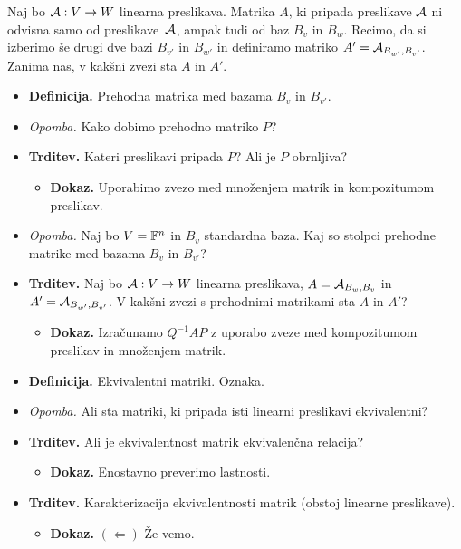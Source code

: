 \begin{enumerate}
    Naj bo $\mathcal{A}: V \to W$ linearna preslikava. Matrika $A$, ki pripada preslikave $\mathcal{A}$ ni odvisna samo od preslikave~$\mathcal{A}$, ampak tudi od baz $B_v$ in $B_w$. Recimo, da si izberimo še drugi dve bazi $B_{v'}$ in $B_{w'}$ in definiramo matriko $A' = \mathcal{A}_{B_{w'}, B_{v'}}$. Zanima nas, v kakšni zvezi sta $A$ in $A'$.
    \begin{itemize}
        \item \colorbox{purple!30}{\textbf{Definicija.}} Prehodna matrika med bazama $B_v$ in $B_{v'}$.
        \item \colorbox{yellow!30}{\emph{Opomba.}} Kako dobimo prehodno matriko $P$?
        \item \colorbox{blue!30}{\textbf{Trditev.}} Kateri preslikavi pripada $P$? Ali je $P$ obrnljiva? 
        \begin{itemize}
            \item \colorbox{green!30}{\textbf{Dokaz.}} Uporabimo zvezo med množenjem matrik in kompozitumom preslikav.
        \end{itemize}
        \item \colorbox{yellow!30}{\emph{Opomba.}} Naj bo $V = \mathbb{F}^n$ in $B_v$ standardna baza. Kaj so stolpci prehodne matrike med bazama $B_v$ in $B_{v'}$?
        \item \colorbox{blue!30}{\textbf{Trditev.}} Naj bo $\mathcal{A}: V \to W$ linearna preslikava, $A = \mathcal{A}_{B_{w}, B_{v}}$ in $A' = \mathcal{A}_{B_{w'}, B_{v'}}$. V kakšni zvezi s prehodnimi matrikami sta $A$ in $A'$?
        \begin{itemize}
            \item \colorbox{green!30}{\textbf{Dokaz.}} Izračunamo $Q^{-1}AP$ z uporabo zveze med kompozitumom preslikav in množenjem matrik.
        \end{itemize}
        \item \colorbox{purple!30}{\textbf{Definicija.}} Ekvivalentni matriki. Oznaka.
        \item \colorbox{yellow!30}{\emph{Opomba.}} Ali sta matriki, ki pripada isti linearni preslikavi ekvivalentni?
        \item \colorbox{blue!30}{\textbf{Trditev.}} Ali je ekvivalentnost matrik ekvivalenčna relacija?
        \begin{itemize}
            \item \colorbox{green!30}{\textbf{Dokaz.}} Enostavno preverimo lastnosti.
        \end{itemize}
        \item \colorbox{blue!30}{\textbf{Trditev.}} Karakterizacija ekvivalentnosti matrik (obstoj linearne preslikave).
        \begin{itemize}
            \item \colorbox{green!30}{\textbf{Dokaz.}} $(\Leftarrow)$ Že vemo.
            

\end{itemize}
\end{itemize}
\end{enumerate}
